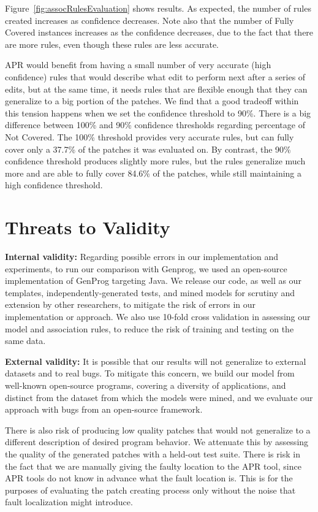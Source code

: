 \documentclass[conference]{IEEEtran}
\begin{document}
Figure~\ref{fig:assocRulesEvaluation} shows results.  As expected, the number of rules created
increases as confidence decreases.  Note also that the
number of Fully Covered instances increases as the confidence decreases, due to
the fact that there are more rules, even though these rules are less accurate.

APR would benefit from having a small number of very accurate (high confidence)
rules that would describe what edit to perform next after a series of edits, but
at the same time, it needs rules that are flexible enough that they can
generalize to a big portion of the patches.
%
We find that a good tradeoff within this tension happens when we set the
confidence threshold to 90\%. There is a big difference between 100\% and 90\%
confidence thresholds regarding percentage of Not Covered. The 100\%
threshold provides very accurate rules, but can fully cover only a
37.7\% of the patches it was evaluated on. By contrast, the 90\% confidence
threshold produces slightly more rules, but the rules generalize much
more and are able to fully cover 84.6\% of the patches, while 
still maintaining a high confidence threshold.



\section{Threats to Validity} \label{threatsVal}

\noindent\textbf{Internal validity:}
Regarding possible errors in our implementation and experiments, to run our
comparison with Genprog, we used an open-source implementation of GenProg
targeting Java. We release our code, as well as our templates,
independently-generated tests, and mined models for scrutiny and extension by other
researchers, to mitigate the risk of errors in our implementation or approach. 
 We also use 10-fold cross validation in
assessing our model and association rules, to reduce the risk of training and testing on the same
data.  

\noindent\textbf{External validity:} 
It is possible 
that our results will not generalize to external datasets and to
real bugs. To mitigate this concern, we build our model from well-known open-source
programs, covering a diversity of applications, and distinct from the dataset
from which the models were mined, and we evaluate our approach with bugs from an open-source framework.

There is also risk of producing low quality patches that would not 
generalize
to a different description of desired program behavior. We attenuate 
this by 
assessing the quality of the generated patches with a held-out test suite.
There is risk in the fact that we are manually giving the
faulty location to the APR tool, since APR tools do not know in advance what the 
fault location is. This is for the purposes of evaluating the patch creating 
process
only without the noise that fault localization might introduce.
\end{document}
